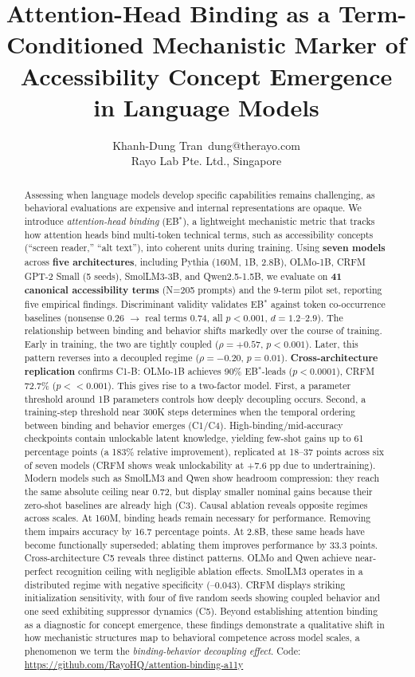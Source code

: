 \documentclass[10pt]{article} %
\title{Attention-Head Binding as a Term-Conditioned Mechanistic Marker of Accessibility Concept Emergence in Language Models}
\author{\name Khanh-Dung Tran\,\orcidlink{0009-0000-0614-2454} \email dung@therayo.com \\
      \addr Rayo Lab Pte. Ltd., Singapore}
\begin{document}
\maketitle

\begin{abstract}
Assessing when language models develop specific capabilities remains challenging, as behavioral evaluations are expensive and internal representations are opaque.
We introduce \emph{attention-head binding} (EB$^*$), a lightweight mechanistic metric that tracks how attention heads bind multi-token technical terms, such as accessibility concepts (``screen reader,'' ``alt text''), into coherent units during training.
Using \textbf{seven models} across \textbf{five architectures}, including Pythia (160M, 1B, 2.8B), OLMo-1B, CRFM GPT-2 Small (5 seeds), SmolLM3-3B, and Qwen2.5-1.5B, we evaluate on \textbf{41 canonical accessibility terms} (N=205 prompts) and the 9-term pilot set, reporting five empirical findings.
Discriminant validity validates EB$^*$ against token co-occurrence baselines (nonsense 0.26 $\to$ real terms 0.74, all $p<0.001$, $d=1.2$--$2.9$).
The relationship between binding and behavior shifts markedly over the course of training. Early in training, the two are tightly coupled ($\rho=+0.57$, $p<0.001$). Later, this pattern reverses into a decoupled regime ($\rho=-0.20$, $p=0.01$).
\textbf{Cross-architecture replication} confirms C1-B: OLMo-1B achieves 90\% EB$^*$-leads ($p<0.0001$), CRFM 72.7\% ($p<<0.001$).
This gives rise to a two-factor model. First, a parameter threshold around 1B parameters controls how deeply decoupling occurs. Second, a training-step threshold near 300K steps determines when the temporal ordering between binding and behavior emerges (C1/C4).
High-binding/mid-accuracy checkpoints contain unlockable latent knowledge, yielding few-shot gains up to 61 percentage points (a 183\% relative improvement), replicated at 18--37 points across six of seven models (CRFM shows weak unlockability at +7.6 pp due to undertraining). Modern models such as SmolLM3 and Qwen show headroom compression: they reach the same absolute ceiling near 0.72, but display smaller nominal gains because their zero-shot baselines are already high (C3).
Causal ablation reveals opposite regimes across scales. At 160M, binding heads remain necessary for performance. Removing them impairs accuracy by 16.7 percentage points. At 2.8B, these same heads have become functionally superseded; ablating them improves performance by 33.3 points.
Cross-architecture C5 reveals three distinct patterns. OLMo and Qwen achieve near-perfect recognition ceiling with negligible ablation effects. SmolLM3 operates in a distributed regime with negative specificity (--0.043). CRFM displays striking initialization sensitivity, with four of five random seeds showing coupled behavior and one seed exhibiting suppressor dynamics (C5).
Beyond establishing attention binding as a diagnostic for concept emergence, these findings demonstrate a qualitative shift in how mechanistic structures map to behavioral competence across model scales, a phenomenon we term the \emph{binding-behavior decoupling effect}.
Code: \url{https://github.com/RayoHQ/attention-binding-a11y}
\end{abstract}
\end{document}
